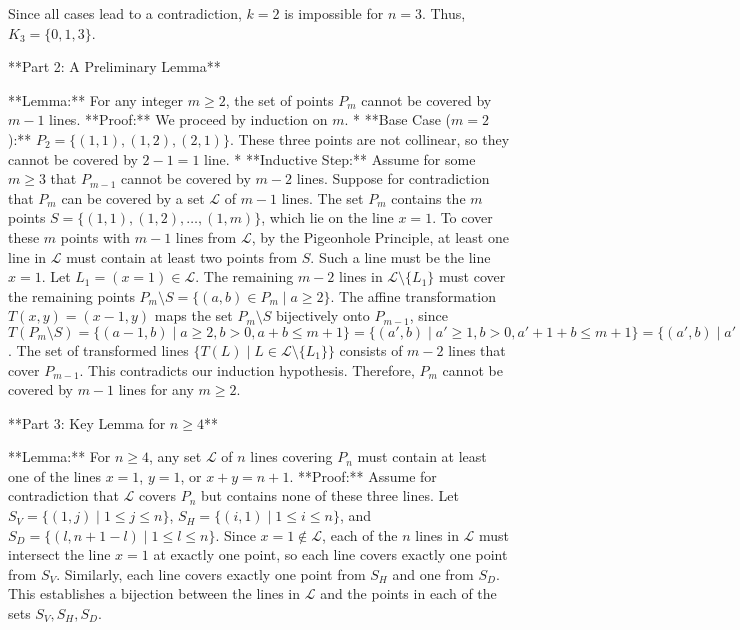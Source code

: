 Since all cases lead to a contradiction, $k=2$ is impossible for $n=3$. Thus, $K_3 = \{0,1,3\}$.

**Part 2: A Preliminary Lemma**

**Lemma:** For any integer $m \ge 2$, the set of points $P_m$ cannot be covered by $m-1$ lines.
**Proof:** We proceed by induction on $m$.
*   **Base Case ($m=2$):** $P_2 = \{(1,1), (1,2), (2,1)\}$. These three points are not collinear, so they cannot be covered by $2-1=1$ line.
*   **Inductive Step:** Assume for some $m \ge 3$ that $P_{m-1}$ cannot be covered by $m-2$ lines. Suppose for contradiction that $P_m$ can be covered by a set $\mathcal{L}$ of $m-1$ lines.
    The set $P_m$ contains the $m$ points $S = \{(1,1), (1,2), \dots, (1,m)\}$, which lie on the line $x=1$. To cover these $m$ points with $m-1$ lines from $\mathcal{L}$, by the Pigeonhole Principle, at least one line in $\mathcal{L}$ must contain at least two points from $S$. Such a line must be the line $x=1$.
    Let $L_1 = (x=1) \in \mathcal{L}$. The remaining $m-2$ lines in $\mathcal{L} \setminus \{L_1\}$ must cover the remaining points $P_m \setminus S = \{(a,b) \in P_m \mid a \ge 2\}$.
    The affine transformation $T(x,y) = (x-1, y)$ maps the set $P_m \setminus S$ bijectively onto $P_{m-1}$, since $T(P_m \setminus S) = \{(a-1,b) \mid a \ge 2, b>0, a+b \le m+1\} = \{(a',b) \mid a' \ge 1, b>0, a'+1+b \le m+1\} = \{(a',b) \mid a'>0, b>0, a'+b \le m\} = P_{m-1}$. The set of transformed lines $\{T(L) \mid L \in \mathcal{L} \setminus \{L_1\}\}$ consists of $m-2$ lines that cover $P_{m-1}$. This contradicts our induction hypothesis.
    Therefore, $P_m$ cannot be covered by $m-1$ lines for any $m \ge 2$.

**Part 3: Key Lemma for $n \ge 4$**

**Lemma:** For $n \ge 4$, any set $\mathcal{L}$ of $n$ lines covering $P_n$ must contain at least one of the lines $x=1$, $y=1$, or $x+y=n+1$.
**Proof:** Assume for contradiction that $\mathcal{L}$ covers $P_n$ but contains none of these three lines.
Let $S_V = \{(1,j) \mid 1 \le j \le n\}$, $S_H = \{(i,1) \mid 1 \le i \le n\}$, and $S_D = \{(l,n+1-l) \mid 1 \le l \le n\}$. Since $x=1 \notin \mathcal{L}$, each of the $n$ lines in $\mathcal{L}$ must intersect the line $x=1$ at exactly one point, so each line covers exactly one point from $S_V$. Similarly, each line covers exactly one point from $S_H$ and one from $S_D$.
This establishes a bijection between the lines in $\mathcal{L}$ and the points in each of the sets $S_V, S_H, S_D$.

